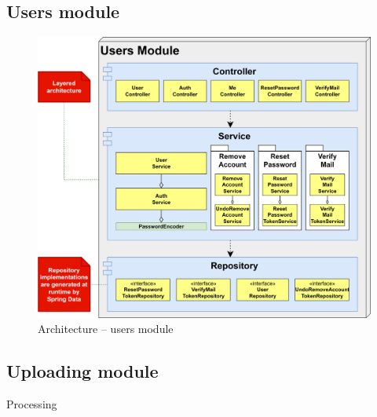 \documentclass[a4paper,twoside,12pt]{book}
\begin{document}
\begin{itemize}
\section{Users module}

\begin{figure}
  \centering
  \includegraphics[width=\linewidth]{img/architecture_users.png}
  \caption{Architecture – users module}
  \label{fig:architecture_users}
\end{figure}

\subsection{Uploading module}

Processing


\end{itemize}
\end{document}
